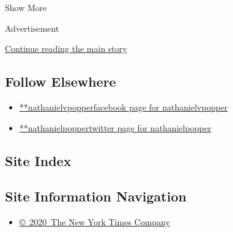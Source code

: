 Show More

Advertisement

\protect\hyperlink{after-mid2}{Continue reading the main story}

\hypertarget{follow-elsewhere}{%
\subsection{Follow Elsewhere}\label{follow-elsewhere}}

\begin{itemize}
\tightlist
\item
  \href{https://www.facebookcorewwwi.onion/nathanielvpopper}{**nathanielvpopperfacebook
  page for nathanielvpopper}
\item
  \href{https://twitter.com/nathanielpopper}{**nathanielpoppertwitter
  page for nathanielpopper}
\end{itemize}

\hypertarget{site-index}{%
\subsection{Site Index}\label{site-index}}

\hypertarget{site-information-navigation}{%
\subsection{Site Information
Navigation}\label{site-information-navigation}}

\begin{itemize}
\tightlist
\item
  \href{https://help.nytimes3xbfgragh.onion/hc/en-us/articles/115014792127-Copyright-notice}{©~2020~The
  New York Times Company}
\end{itemize}

